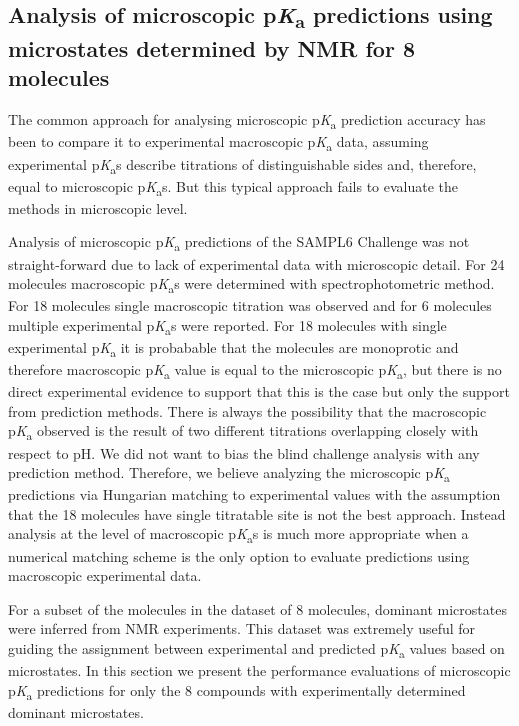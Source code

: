 \documentclass[9pt,lineno,final]{elife}
\newcommand{\pKa}{p\textit{K}\textsubscript{a}}
\begin{document}
\subsection{Analysis of microscopic \pKa{} predictions using microstates determined by NMR for 8 molecules}

The common approach for analysing microscopic \pKa{} prediction accuracy has been to compare it to experimental macroscopic \pKa{} data, assuming experimental \pKa{}s describe titrations of distinguishable sides and, therefore, equal to microscopic \pKa{}s. But this typical approach fails to evaluate the methods in microscopic level.

Analysis of microscopic \pKa{} predictions of the SAMPL6 Challenge was not straight-forward due to lack of experimental data with microscopic detail. For 24 molecules macroscopic \pKa{}s were determined with spectrophotometric method. 
For 18 molecules single macroscopic titration was observed and for 6 molecules multiple experimental \pKa{}s were reported. 
For 18 molecules with single experimental \pKa{} it is probabable that the molecules are monoprotic and therefore macroscopic \pKa{} value is equal to the microscopic \pKa{}, but there is no direct experimental evidence to support that this is the case but only the support from prediction methods. 
There is always the possibility that the macroscopic \pKa{} observed is the result of two different titrations overlapping closely with respect to pH. 
We did not want to bias the blind challenge analysis with any prediction method. 
Therefore, we believe analyzing the microscopic \pKa{} predictions via Hungarian matching to experimental values with the assumption that the 18 molecules have single titratable site is not the best approach. 
Instead analysis at the level of macroscopic \pKa{}s is much more appropriate when a numerical matching scheme is the only option to evaluate predictions using macroscopic experimental data.

For a subset of the molecules in the dataset of 8 molecules, dominant microstates were inferred from NMR experiments. This dataset was extremely useful for guiding the assignment between experimental and predicted \pKa{} values based on microstates. In this section we present the performance evaluations of microscopic \pKa{} predictions for only the 8 compounds with experimentally determined dominant microstates.
\end{document}
